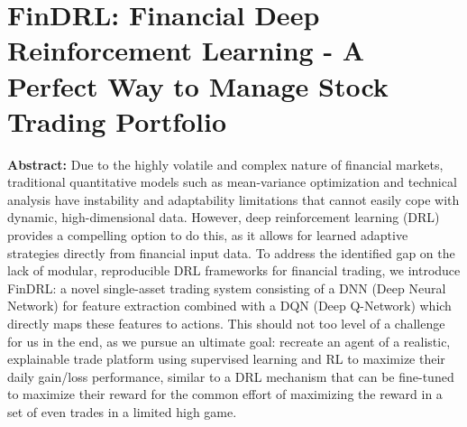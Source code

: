 \chapter{FinDRL: Financial Deep Reinforcement Learning - A Perfect Way to Manage Stock Trading Portfolio}

\textbf{Abstract: } 
Due to the highly volatile and complex nature of financial markets, traditional quantitative models such as mean-variance optimization and technical analysis have instability and adaptability limitations that cannot easily cope with dynamic, high-dimensional data. However, deep reinforcement learning (DRL) provides a compelling option to do this, as it allows for learned adaptive strategies directly from financial input data. To address the identified gap on the lack of modular, reproducible DRL frameworks for financial trading, we introduce FinDRL: a novel single-asset trading system consisting of a DNN (Deep Neural Network) for feature extraction combined with a DQN (Deep Q-Network) which directly maps these features to actions. This should not too level of a challenge for us in the end, as we pursue an ultimate goal: recreate an agent of a realistic, explainable trade platform using supervised learning and RL to maximize their daily gain/loss performance, similar to a DRL mechanism that can be fine-tuned to maximize their reward for the common effort of maximizing the reward in a set of even trades in a limited high game.

